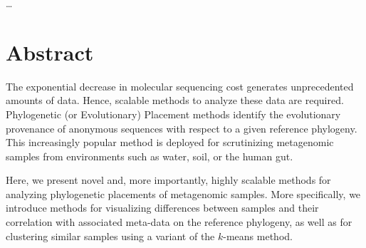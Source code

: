 \documentclass[10pt,letterpaper]{article}
\newcommand\todo[1]{{\color{purple}{#1}}}
\newcommand\alexis[1]{{\color{orange}{#1}}}
\begin{document}

\begin{acronym}
    \ldots
\end{acronym}



\section*{Abstract}

The exponential decrease in molecular sequencing cost generates unprecedented amounts of data.
Hence, scalable methods to analyze these data are required. %
Phylogenetic (or Evolutionary) Placement methods identify the evolutionary provenance of anonymous
sequences with respect to a given reference phylogeny.
This increasingly popular method is deployed for scrutinizing metagenomic samples
from environments such as water, soil, or the human gut.

Here, we present novel and, more importantly, highly scalable methods for analyzing phylogenetic placements of metagenomic samples.
More specifically, we introduce methods %
for visualizing differences between samples and their correlation with associated meta-data on the reference phylogeny,
as well as for clustering similar samples using a variant of the $k$-means method.
\end{document}
